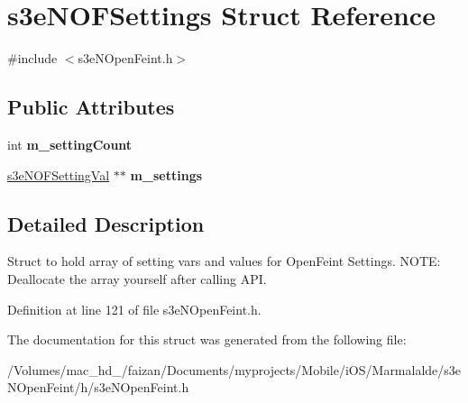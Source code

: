\hypertarget{structs3e_n_o_f_settings}{
\section{s3eNOFSettings Struct Reference}
\label{structs3e_n_o_f_settings}
}


{\ttfamily \#include $<$s3eNOpenFeint.h$>$}

\subsection*{Public Attributes}
\begin{DoxyCompactItemize}
\item 
\hypertarget{structs3e_n_o_f_settings_a49975f78aec4d957857034f8c6132cad}{
int {\bfseries m\_\-settingCount}}
\label{structs3e_n_o_f_settings_a49975f78aec4d957857034f8c6132cad}

\item 
\hypertarget{group___n_open_feint_api_group_ga02c14e35d772130e5b77cabb7fa73a9b}{
\hyperlink{structs3e_n_o_f_setting_val}{s3eNOFSettingVal} $\ast$$\ast$ {\bfseries m\_\-settings}}
\label{group___n_open_feint_api_group_ga02c14e35d772130e5b77cabb7fa73a9b}

\end{DoxyCompactItemize}


\subsection{Detailed Description}
Struct to hold array of setting vars and values for OpenFeint Settings. NOTE: Deallocate the array yourself after calling API. 

Definition at line 121 of file s3eNOpenFeint.h.



The documentation for this struct was generated from the following file:\begin{DoxyCompactItemize}
\item 
/Volumes/mac\_\-hd\_/faizan/Documents/myprojects/Mobile/iOS/Marmalalde/s3eNOpenFeint/h/s3eNOpenFeint.h\end{DoxyCompactItemize}
